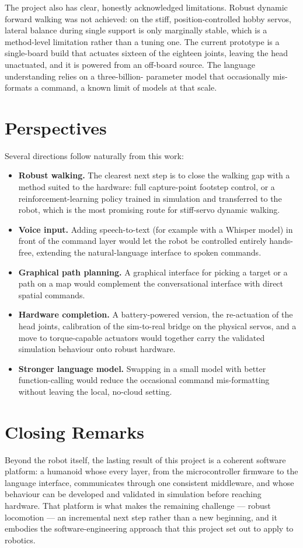 The project also has clear, honestly acknowledged limitations. Robust
dynamic forward walking was not achieved: on the stiff, position-controlled
hobby servos, lateral balance during single support is only marginally
stable, which is a method-level limitation rather than a tuning one. The
current prototype is a single-board build that actuates sixteen of the
eighteen joints, leaving the head unactuated, and it is powered from an
off-board source. The language understanding relies on a three-billion-
parameter model that occasionally mis-formats a command, a known limit of
models at that scale.

\section{Perspectives}
Several directions follow naturally from this work:

\begin{itemize}[itemsep=3pt,topsep=4pt]
  \item \textbf{Robust walking.} The clearest next step is to close the
        walking gap with a method suited to the hardware: full
        capture-point footstep control, or a reinforcement-learning policy
        trained in simulation and transferred to the robot, which is the
        most promising route for stiff-servo dynamic walking.
  \item \textbf{Voice input.} Adding speech-to-text (for example with a
        Whisper model) in front of the command layer would let the robot be
        controlled entirely hands-free, extending the natural-language
        interface to spoken commands.
  \item \textbf{Graphical path planning.} A graphical interface for picking
        a target or a path on a map would complement the conversational
        interface with direct spatial commands.
  \item \textbf{Hardware completion.} A battery-powered version, the
        re-actuation of the head joints, calibration of the sim-to-real
        bridge on the physical servos, and a move to torque-capable
        actuators would together carry the validated simulation behaviour
        onto robust hardware.
  \item \textbf{Stronger language model.} Swapping in a small model with
        better function-calling would reduce the occasional command
        mis-formatting without leaving the local, no-cloud setting.
\end{itemize}

\section{Closing Remarks}
Beyond the robot itself, the lasting result of this project is a coherent
software platform: a humanoid whose every layer, from the microcontroller
firmware to the language interface, communicates through one consistent
middleware, and whose behaviour can be developed and validated in
simulation before reaching hardware. That platform is what makes the
remaining challenge --- robust locomotion --- an incremental next step rather
than a new beginning, and it embodies the software-engineering approach
that this project set out to apply to robotics.
